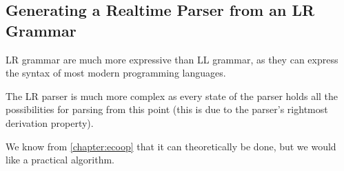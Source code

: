 \subsection{Generating a Realtime Parser from an LR Grammar}
LR grammar are much more expressive than LL grammar, as they 
can express the syntax of most modern programming languages.

The LR parser is much more complex as every state of the parser holds all the
possibilities for parsing from this point (this is due to the parser's rightmost
derivation property).

We know from \cref{chapter:ecoop} that it can theoretically be done,
but we would like a practical algorithm.
